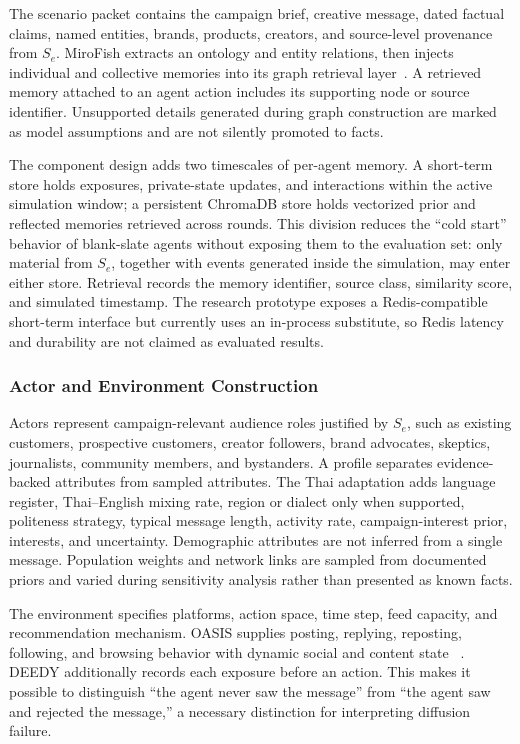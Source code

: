 \documentclass[conference]{IEEEtran}
\begin{document}
The scenario packet contains the campaign brief, creative message, dated
factual claims, named entities, brands, products, creators, and source-level
provenance from $S_e$.
MiroFish extracts an ontology and entity relations, then injects individual and
collective memories into its graph retrieval layer~\cite{mirofish2026}. A
retrieved memory attached to an agent action includes its supporting node or
source identifier. Unsupported details generated during graph construction are
marked as model assumptions and are not silently promoted to facts.

The component design adds two timescales of per-agent memory. A short-term
store holds exposures, private-state updates, and interactions within the
active simulation window; a persistent ChromaDB store holds vectorized prior
and reflected memories retrieved across rounds. This division reduces the
``cold start'' behavior of blank-slate agents without exposing them to the
evaluation set: only material from $S_e$, together with events generated inside
the simulation, may enter either store. Retrieval records the memory identifier,
source class, similarity score, and simulated timestamp. The research
prototype exposes a Redis-compatible short-term interface but currently uses
an in-process substitute, so Redis latency and durability are not claimed as
evaluated results.

\subsubsection{Actor and Environment Construction}

Actors represent campaign-relevant audience roles justified by $S_e$, such as
existing customers, prospective customers, creator followers, brand advocates,
skeptics, journalists, community members, and bystanders. A profile separates
evidence-backed attributes from sampled attributes. The Thai adaptation adds
language register, Thai--English mixing rate, region or dialect only when
supported, politeness strategy, typical message length, activity rate,
campaign-interest prior, interests, and uncertainty. Demographic attributes
are not inferred from a single message. Population weights and network links
are sampled from documented priors and varied during sensitivity analysis
rather than presented as known facts.

The environment specifies platforms, action space, time step, feed capacity,
and recommendation mechanism. OASIS supplies posting, replying, reposting,
following, and browsing behavior with dynamic social and content state
~\cite{yang2024oasis}. DEEDY additionally records each exposure before an
action. This makes it possible to distinguish ``the agent never saw the
message'' from ``the agent saw and rejected the message,'' a necessary
distinction for interpreting diffusion failure.
\end{document}

